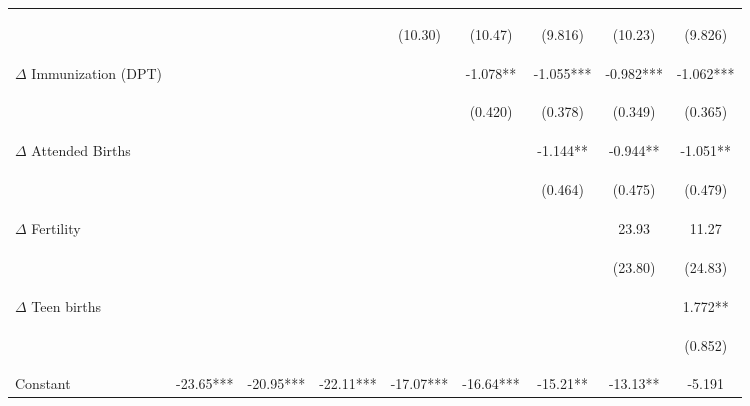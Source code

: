 \begin{landscape}
\begin{table}[htpb!]
\begin{center}
\begin{tabular}{lcccccccc}
&&&&\begin{footnotesize}(10.30)\end{footnotesize}&\begin{footnotesize}(10.47)\end{footnotesize}&\begin{footnotesize}(9.816)\end{footnotesize}&\begin{footnotesize}(10.23)\end{footnotesize}&\begin{footnotesize}(9.826)\end{footnotesize}\\
$\Delta$ Immunization (DPT) &&&&&-1.078**&-1.055***&-0.982***&-1.062***\\
&&&&&\begin{footnotesize}(0.420)\end{footnotesize}&\begin{footnotesize}(0.378)\end{footnotesize}&\begin{footnotesize}(0.349)\end{footnotesize}&\begin{footnotesize}(0.365)\end{footnotesize}\\
$\Delta$ Attended Births&&&&&&-1.144**&-0.944**&-1.051**\\
&&&&&&\begin{footnotesize}(0.464)\end{footnotesize}&\begin{footnotesize}(0.475)\end{footnotesize}&\begin{footnotesize}(0.479)\end{footnotesize}\\
$\Delta$ Fertility&&&&&&&23.93&11.27\\
&&&&&&&\begin{footnotesize}(23.80)\end{footnotesize}&\begin{footnotesize}(24.83)\end{footnotesize}\\
$\Delta$ Teen births&&&&&&&&1.772**\\
&&&&&&&&\begin{footnotesize}(0.852)\end{footnotesize}\\
Constant&-23.65***&-20.95***&-22.11***&-17.07***&-16.64***&-15.21**&-13.13**&-5.191\\

\end{tabular}
\end{center}
\end{table}
\end{landscape}
